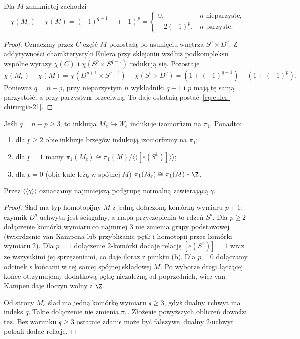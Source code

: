 \begin{stwierdzenie}
\label{prop:euler-chirurgia-21}
Dla $M$ zamkniętej zachodzi
\begin{equation}\label{eq:euler-chirurgia-21}
 \chi(M_e)-\chi(M)
 =(-1)^{q-1}-(-1)^p
 =\begin{cases}
    0,&n\text{ nieparzyste},\\
    -2(-1)^p,&n\text{ parzyste}.
   \end{cases}
\end{equation}
\end{stwierdzenie}
\begin{proof}
Oznaczmy przez $C$ część $M$ pozostałą
po usunięciu wnętrza $S^p\times D^q$.
Z addytywności charakterystyki Eulera przy
sklejaniu wzdłuż podkompleksu wspólne wyrazy
$\chi(C)$ i $\chi(S^p\times S^{q-1})$ redukują się.
Pozostaje
\[
 \chi(M_e)-\chi(M)
 =\chi(D^{p+1}\times S^{q-1})
  -\chi(S^p\times D^q)
 =(1+(-1)^{q-1})-(1+(-1)^p).
\]
Ponieważ $q=n-p$, przy nieparzystym $n$
wykładniki $q-1$ i $p$ mają tę samą parzystość,
a przy parzystym przeciwną. To daje
ostatnią postać~\eqref{eq:euler-chirurgia-21}.
\end{proof}

\begin{twierdzenie}
\label{thm:pi1-chirurgia-21}
Jeśli $q=n-p\geq3$, to inkluzja $M_e\hookrightarrow W_e$
indukuje izomorfizm na $\pi_1$. Ponadto:
\begin{enumerate}[label=(\alph*)]
\item dla $p\geq2$ obie inkluzje brzegów indukują
izomorfizmy na $\pi_1$;
\item dla $p=1$ mamy
$\pi_1(M_e)\cong\pi_1(M)/\langle\!\langle[e(S^1)]\rangle\!\rangle$;
\item dla $p=0$ (obie kule leżą w spójnej $M$)
$\pi_1(M_e)\cong\pi_1(M)*\Z$.
\end{enumerate}
Przez $\langle\!\langle\gamma\rangle\!\rangle$
oznaczamy najmniejszą podgrupę normalną
zawierającą $\gamma$.
\end{twierdzenie}
\begin{proof}
Ślad ma typ homotopijny $M$ z jedną dołączoną
komórką wymiaru $p+1$: czynnik $D^q$ uchwytu
jest ściągalny, a mapa przyczepienia to rdzeń $S^p$.
Dla $p\geq2$ dołączenie komórki wymiaru
co najmniej $3$ nie zmienia grupy podstawowej
(twierdzenie van Kampena lub przybliżanie pętli
i homotopii przez komórki wymiaru $2$).
Dla $p=1$ dołączenie $2$-komórki dodaje relację
$[e(S^1)]=1$ wraz ze wszystkimi jej sprzężeniami,
co daje iloraz z punktu (b). Dla $p=0$
dołączamy odcinek z końcami w tej samej spójnej
składowej $M$. Po wyborze drogi łączącej końce
otrzymujemy dodatkową pętlę niezależną od
poprzednich, więc van Kampen daje iloczyn wolny
z $\Z$.

Od strony $M_e$ ślad ma jedną komórkę wymiaru
$q\geq3$, gdyż dualny uchwyt ma indeks $q$.
Takie dołączenie nie zmienia $\pi_1$.
Złożenie powyższych obliczeń dowodzi tez.
Bez warunku $q\geq3$ ostatnie zdanie może być
fałszywe: dualny $2$-uchwyt potrafi dodać relację.
\end{proof}

